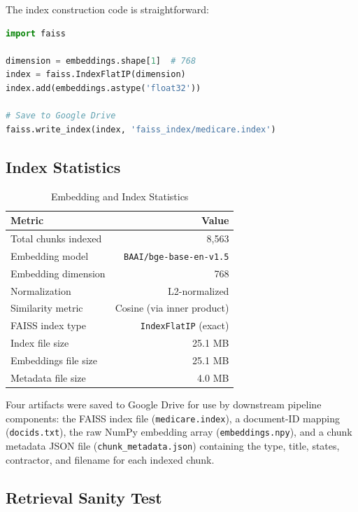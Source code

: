 \documentclass[10pt, letterpaper]{article}
\begin{document}
The index construction code is straightforward:

\begin{lstlisting}[language=Python, caption=Building and saving the FAISS index]
import faiss

dimension = embeddings.shape[1]  # 768
index = faiss.IndexFlatIP(dimension)
index.add(embeddings.astype('float32'))

# Save to Google Drive
faiss.write_index(index, 'faiss_index/medicare.index')
\end{lstlisting}

\subsection{Index Statistics}

\begin{table}[h]
\centering
\caption{Embedding and Index Statistics}
\label{tab:indexstats}
\begin{tabular}{@{}lr@{}}
\toprule
\textbf{Metric} & \textbf{Value} \\
\midrule
Total chunks indexed        & 8,563 \\
Embedding model             & \texttt{BAAI/bge-base-en-v1.5} \\
Embedding dimension         & 768 \\
Normalization               & L2-normalized \\
Similarity metric           & Cosine (via inner product) \\
FAISS index type            & \texttt{IndexFlatIP} (exact) \\
Index file size             & 25.1 MB \\
Embeddings file size        & 25.1 MB \\
Metadata file size          & 4.0 MB \\
\bottomrule
\end{tabular}
\end{table}

Four artifacts were saved to Google Drive for use by downstream pipeline components:
the FAISS index file (\texttt{medicare.index}), a document-ID mapping
(\texttt{docids.txt}), the raw NumPy embedding array (\texttt{embeddings.npy}), and
a chunk metadata JSON file (\texttt{chunk\_metadata.json}) containing the type, title,
states, contractor, and filename for each indexed chunk.

\subsection{Retrieval Sanity Test}
\end{document}

